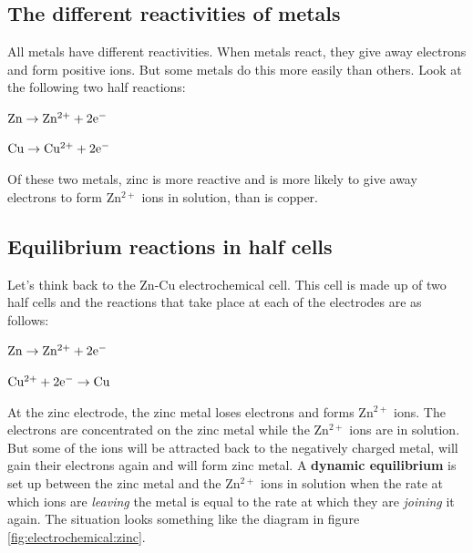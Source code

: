 \subsection{The different reactivities of metals}
\label{subsec:electrochemical:metal reactivity}

All metals have different reactivities. When metals react, they give away electrons and form positive ions. But some metals do this more easily than others. Look at the following two half reactions:

\begin{center}
$\rm{Zn \rightarrow Zn^{2+} + 2e^{-}}$

$\rm{Cu \rightarrow Cu^{2+} + 2e^{-}}$
\end{center}

Of these two metals, zinc is more reactive and is more likely to give away electrons to form Zn$^{2+}$ ions in solution, than is copper.

\subsection{Equilibrium reactions in half cells}
\label{subsec:electrochemical:equilibrium reactions}

Let's think back to the Zn-Cu electrochemical cell. This cell is made up of two half cells and the reactions that take place at each of the electrodes are as follows:

\begin{center}
$\rm{Zn \rightarrow Zn^{2+} + 2e^{-}}$

$\rm{Cu^{2+} + 2e^{-} \rightarrow Cu}$
\end{center}

At the zinc electrode, the zinc metal loses electrons and forms Zn$^{2+}$ ions. The electrons are concentrated on the zinc metal while the Zn$^{2+}$ ions are in solution. But some of the ions will be attracted back to the negatively charged metal, will gain their electrons again and will form zinc metal. A \textbf{dynamic equilibrium} is set up between the zinc metal and the Zn$^{2+}$ ions in solution when the rate at which ions are \textit{leaving} the metal is equal to the rate at which they are \textit{joining} it again. The situation looks something like the diagram in figure \ref{fig:electrochemical:zinc}.

